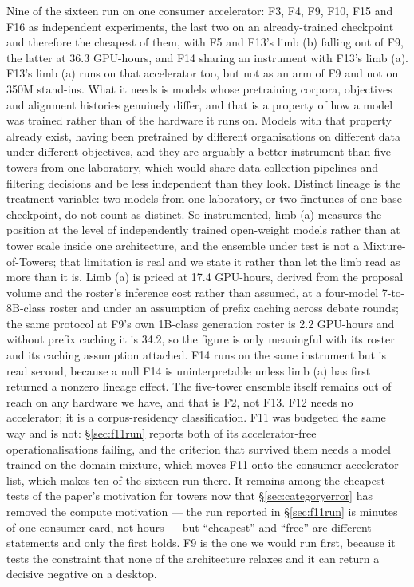 \documentclass[11pt]{article}
\begin{document}
Nine of the sixteen run on one consumer accelerator: F3, F4, F9, F10, F15 and F16 as independent experiments, the last two on an already-trained checkpoint and therefore the cheapest of them, with F5 and F13's limb (b) falling out of F9, the latter at 36.3 GPU-hours, and F14 sharing an instrument with F13's limb (a). F13's limb (a) runs on that accelerator too, but not as an arm of F9 and not on 350M stand-ins. What it needs is models whose pretraining corpora, objectives and alignment histories genuinely differ, and that is a property of how a model was trained rather than of the hardware it runs on. Models with that property already exist, having been pretrained by different organisations on different data under different objectives, and they are arguably a better instrument than five towers from one laboratory, which would share data-collection pipelines and filtering decisions and be less independent than they look. Distinct lineage is the treatment variable: two models from one laboratory, or two finetunes of one base checkpoint, do not count as distinct. So instrumented, limb (a) measures the position at the level of independently trained open-weight models rather than at tower scale inside one architecture, and the ensemble under test is not a Mixture-of-Towers; that limitation is real and we state it rather than let the limb read as more than it is. Limb (a) is priced at 17.4 GPU-hours, derived from the proposal volume and the roster's inference cost rather than assumed, at a four-model 7-to-8B-class roster and under an assumption of prefix caching across debate rounds; the same protocol at F9's own 1B-class generation roster is 2.2 GPU-hours and without prefix caching it is 34.2, so the figure is only meaningful with its roster and its caching assumption attached. F14 runs on the same instrument but is read second, because a null F14 is uninterpretable unless limb (a) has first returned a nonzero lineage effect. The five-tower ensemble itself remains out of reach on any hardware we have, and that is F2, not F13. F12 needs no accelerator; it is a corpus-residency classification. F11 was budgeted the same way and is not: \S\ref{sec:f11run} reports both of its accelerator-free operationalisations failing, and the criterion that survived them needs a model trained on the domain mixture, which moves F11 onto the consumer-accelerator list, which makes ten of the sixteen run there. It remains among the cheapest tests of the paper's motivation for towers now that \S\ref{sec:categoryerror} has removed the compute motivation --- the run reported in \S\ref{sec:f11run} is minutes of one consumer card, not hours --- but ``cheapest'' and ``free'' are different statements and only the first holds. F9 is the one we would run first, because it tests the constraint that none of the architecture relaxes and it can return a decisive negative on a desktop.
\end{document}
